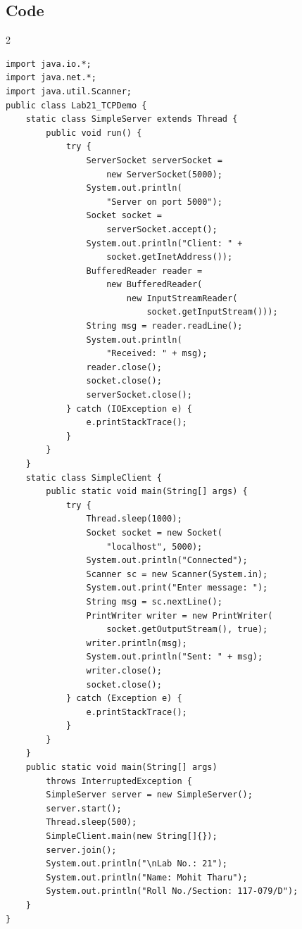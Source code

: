\documentclass[10pt,a4paper]{article}
\begin{document}
\subsection*{Code}
\begin{multicols}{2}
\begin{lstlisting}
import java.io.*;
import java.net.*;
import java.util.Scanner;
public class Lab21_TCPDemo {
    static class SimpleServer extends Thread {
        public void run() {
            try {
                ServerSocket serverSocket = 
                    new ServerSocket(5000);
                System.out.println(
                    "Server on port 5000");
                Socket socket = 
                    serverSocket.accept();
                System.out.println("Client: " + 
                    socket.getInetAddress());
                BufferedReader reader = 
                    new BufferedReader(
                        new InputStreamReader(
                            socket.getInputStream()));
                String msg = reader.readLine();
                System.out.println(
                    "Received: " + msg);
                reader.close();
                socket.close();
                serverSocket.close();
            } catch (IOException e) {
                e.printStackTrace();
            }
        }
    }
    static class SimpleClient {
        public static void main(String[] args) {
            try {
                Thread.sleep(1000);
                Socket socket = new Socket(
                    "localhost", 5000);
                System.out.println("Connected");
                Scanner sc = new Scanner(System.in);
                System.out.print("Enter message: ");
                String msg = sc.nextLine();
                PrintWriter writer = new PrintWriter(
                    socket.getOutputStream(), true);
                writer.println(msg);
                System.out.println("Sent: " + msg);
                writer.close();
                socket.close();
            } catch (Exception e) {
                e.printStackTrace();
            }
        }
    }
    public static void main(String[] args) 
        throws InterruptedException {
        SimpleServer server = new SimpleServer();
        server.start();
        Thread.sleep(500);
        SimpleClient.main(new String[]{});
        server.join();
        System.out.println("\nLab No.: 21");
        System.out.println("Name: Mohit Tharu");
        System.out.println("Roll No./Section: 117-079/D");
    }
}
\end{lstlisting}
\end{multicols}
\end{document}
